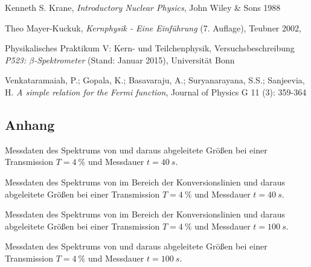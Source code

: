 \documentclass[11pt, a4paper]{article}
\numberwithin{equation}{section}
\begin{document}
\clearpage
\vspace{\fill}
\begin{thebibliography}{19}
	Kenneth S. Krane,
	\emph{Introductory Nuclear Physics},
	John Wiley \& Sons 1988

	Theo Mayer-Kuckuk,
	\emph{Kernphysik - Eine Einführung} (7. Auflage),
	Teubner 2002,

	Physikalisches Praktikum V: Kern- und Teilchenphysik,
	Versuchsbeschreibung \emph{P523: $\beta$-Spektrometer} (Stand: Januar 2015),
	Universität Bonn	

	Venkataramaiah, P.; Gopala, K.; Basavaraju, A.; Suryanarayana, S.S.; Sanjeevia, H.
	\emph{A simple relation for the Fermi function},
	Journal of Physics G 11 (3): 359-364
 
\end{thebibliography}

\clearpage

\begin{appendix}
\section{Anhang}
\begin{table}
	\centering
	
	\caption{Messdaten des Spektrums von  und daraus abgeleitete Größen bei einer Transmission $T = \SI{4}{\percent}$ und Messdauer $t = \SI{40}{s}$.}
	\label{tab:spektrum_ba4_grob}
\end{table}

\begin{table}
	\centering
	
	\caption{Messdaten des Spektrums von  im Bereich der  Konversionslinien und daraus abgeleitete Größen bei einer Transmission $T = \SI{4}{\percent}$ und Messdauer $t = \SI{40}{s}$.}
	\label{tab:spektrum_ba4_fein}
\end{table}

\begin{table}
	\centering
	
	\caption{Messdaten des Spektrums von  im Bereich der  Konversionslinien und daraus abgeleitete Größen bei einer Transmission $T = \SI{4}{\percent}$ und Messdauer $t = \SI{100}{s}$.}
	\label{tab:spektrum_ba1_fein}
\end{table}

\begin{table}
	\centering
	
	\caption{Messdaten des Spektrums von  und daraus abgeleitete Größen bei einer Transmission $T = \SI{4}{\percent}$ und Messdauer $t = \SI{100}{s}$.}
	\label{tab:spektrum_tl}
\end{table}

\end{appendix}
\end{document}

